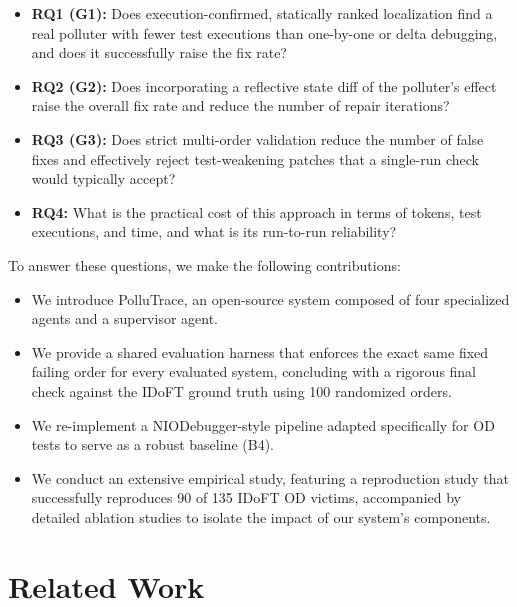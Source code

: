 \documentclass[conference]{IEEEtran}
\begin{document}
\begin{itemize}
\item \textbf{RQ1 (G1):} Does execution-confirmed, statically ranked localization find a real polluter with fewer test executions than one-by-one or delta debugging, and does it successfully raise the fix rate?
\item \textbf{RQ2 (G2):} Does incorporating a reflective state diff of the polluter's effect raise the overall fix rate and reduce the number of repair iterations?
\item \textbf{RQ3 (G3):} Does strict multi-order validation reduce the number of false fixes and effectively reject test-weakening patches that a single-run check would typically accept?
\item \textbf{RQ4:} What is the practical cost of this approach in terms of tokens, test executions, and time, and what is its run-to-run reliability?
\end{itemize}

To answer these questions, we make the following contributions:

\begin{itemize}
\item We introduce PolluTrace, an open-source system composed of four specialized agents and a supervisor agent.
\item We provide a shared evaluation harness that enforces the exact same fixed failing order for every evaluated system, concluding with a rigorous final check against the IDoFT ground truth using 100 randomized orders.
\item We re-implement a NIODebugger-style pipeline adapted specifically for OD tests to serve as a robust baseline (B4).
\item We conduct an extensive empirical study, featuring a reproduction study that successfully reproduces 90 of 135 IDoFT OD victims, accompanied by detailed ablation studies to isolate the impact of our system's components.
\end{itemize}

\section{Related Work}
\label{sec:related}
\end{document}
